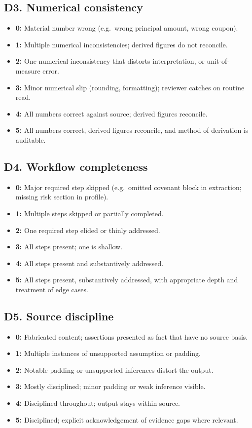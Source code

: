 \documentclass[11pt]{article}
\begin{document}
\subsection*{D3. Numerical consistency}
\begin{itemize}[leftmargin=*,itemsep=0.1em]
\item \textbf{0:} Material number wrong (e.g.\ wrong principal amount, wrong coupon).
\item \textbf{1:} Multiple numerical inconsistencies; derived figures do not reconcile.
\item \textbf{2:} One numerical inconsistency that distorts interpretation, or unit-of-measure error.
\item \textbf{3:} Minor numerical slip (rounding, formatting); reviewer catches on routine read.
\item \textbf{4:} All numbers correct against source; derived figures reconcile.
\item \textbf{5:} All numbers correct, derived figures reconcile, and method of derivation is auditable.
\end{itemize}

\subsection*{D4. Workflow completeness}
\begin{itemize}[leftmargin=*,itemsep=0.1em]
\item \textbf{0:} Major required step skipped (e.g.\ omitted covenant block in extraction; missing risk section in profile).
\item \textbf{1:} Multiple steps skipped or partially completed.
\item \textbf{2:} One required step elided or thinly addressed.
\item \textbf{3:} All steps present; one is shallow.
\item \textbf{4:} All steps present and substantively addressed.
\item \textbf{5:} All steps present, substantively addressed, with appropriate depth and treatment of edge cases.
\end{itemize}

\subsection*{D5. Source discipline}
\begin{itemize}[leftmargin=*,itemsep=0.1em]
\item \textbf{0:} Fabricated content; assertions presented as fact that have no source basis.
\item \textbf{1:} Multiple instances of unsupported assumption or padding.
\item \textbf{2:} Notable padding or unsupported inferences distort the output.
\item \textbf{3:} Mostly disciplined; minor padding or weak inference visible.
\item \textbf{4:} Disciplined throughout; output stays within source.
\item \textbf{5:} Disciplined; explicit acknowledgement of evidence gaps where relevant.
\end{itemize}
\end{document}

